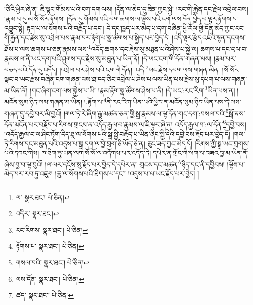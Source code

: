 །ཅིའི་ཕྱིར་ཞེ་ན། ཇི་ལྟར་གོམས་པའི་ངག་དག་ལས། །དོན་ལ་མེད་དུ་ཟིན་ཀྱང་སྐྱེ། །རང་གི་རྐྱེན་དང་རྗེས་འབྲེལ་བས། །རྣམ་པ་དུ་མ་སོ་སོར་རྟོགས། །དོན་དུ་གོམས་པའི་བག་ཆགས་ལ་ལྟོས་པའི་ངག་ལས་དོན་བྱེད་པ་ལྟར་རྟོགས་པ་འབྱུང་སྟེ། རྟག་པ་ལ་སོགས་པའི་བརྗོད་པ་དང་། དེ་དང་ཁྱད་པར་མེད་པ་དག་བཞིན་ཕྱི་རོལ་གྱི་དོན་མེད་ཀྱང་རང་གི་རྐྱེན་དང་རྗེས་སུ་འབྲེལ་པས་རྣམ་པར་རྟོག་པ་སྣ་ཚོགས་པ་སྐྱེད་པར་བྱེད་དོ། །འདི་ལྟར་རྩེད་འཇོའི་སྙན་དངགས་ཐོས་པ་ལས་ཆགས་པ་ཅན་རྣམས་ལས་\footnote{ལ་  སྣར་ཐང་།  པེ་ཅིན། }འདོད་ཆགས་དང་རྗེས་སུ་མཐུན་པའི་ཤེས་པ་སྐྱེ་ལ། ཆགས་པ་དང་བྲལ་བ་རྣམས་ལ་ནི་ཡང་དག་པའི་ཤུགས་དང་རྗེས་སུ་མཐུན་པ་ཡིན་ནོ། །དེ་ཡང་ངག་གི་དོན་གཞན་ལས། །རྣམ་པར་བཅད་པའི་དོན་དུ་འདོད། །འབྲེལ་པར་ཤེས་པའི་ངག་གི་དོན། །འདི་\footnote{འདིར་  སྣར་ཐང་། }ཡང་རྗེས་དཔག་ལས་གཞན་མིན། །སོ་སོར་སྣང་བ་ཡང་རྫས་བཞིན་ངག་གཞན་ལས་ཐ་དད་ཅིང་འབྲེལ་པ་ཤེས་པ་ལས་ཡིན་པས་རྗེས་སུ་དཔག་པ་ལས་གཞན་མ་ཡིན་ནོ། །གང་ཞིག་ངག་ལས་སྐྱེས་པ་ཡི། །རྣམ་རྟོག་སྣ་ཚོགས་ཤེས་པ་ནི། །དེ་ཡང་:རང་རིག་\footnote{རང་རིགས་  སྣར་ཐང་།  པེ་ཅིན། }ཡིན་པས་ན། །མངོན་སུམ་ཉིད་ལས་གཞན་མ་ཡིན། །:རྟོག་པ་\footnote{རྟོགས་པ་  སྣར་ཐང་།  པེ་ཅིན། }ནི་རང་རིག་ཡིན་པའི་ཕྱིར་ན་མངོན་སུམ་ཉིད་ཡིན་པས་དེ་ལས་གཞན་དུ་དབྱེ་བར་མི་བྱའོ། །གལ་ཏེ་རེ་ཞིག་རྒྱུ་མཚན་ཅན་གྱི་སྒྲ་རྣམས་ལ་ལྟ་དོན་གང་དག་:བསལ་བའི་\footnote{གསལ་བའི་  སྣར་ཐང་།  པེ་ཅིན། }སྒོ་ནས་དོན་མངོན་པར་བརྗོད་པ་རིགས་གྲངས་ན་འདོད་རྒྱལ་བ་རྣམས་ལ་ཇི་ལྟར་ཞེ་ན། འདོད་རྒྱལ་བ་:ལ་དོན་\footnote{ལས་དོན་  སྣར་ཐང་།  པེ་ཅིན། }དབྱེ་བས། །འདོད་རྒྱལ་བ་ལ་ཤིང་ཏོག་དིད་ཐཱ་ལ་སོགས་པའི་སྒྲ་སྤྱི་བརྗོད་པ་ཡིན་ཞིང་སྤྱི་དེའི་དབྱེ་བས་རྗོད་པར་བྱེད་དོ། །གལ་ཏེ་རིགས་དང་མཐུན་པའི་འདུས་པ་སྒྲ་དག་ལ་བྱེ་བྲག་ཅི་ཡོད་ཅེ་ན། ཅུང་ཟད་ཀྱང་མེད་དོ། །རིགས་ཀྱི་སྒྲ་ཡང་གྲགས་པའི་དབང་གིས། ཁ་ཅིག་ཏུ་ཡན་ལག་སོ་སོ་ལ་འདོགས་པར་འདོད་དེ། དཔེར་ན་གྲོང་གི་ཕག་པ་བཟའ་བྱ་མ་ཡིན་ནོ་ཞེས་བྱ་བ་ལྟ་བུའོ། །ལ་ལར་དངོས་སུ་རྗོད་པར་བྱེད་དེ་དཔེར་ན། གྲངས་དང་མཚན་\footnote{ཚད་  སྣར་ཐང་།  པེ་ཅིན། }ཉིད་དང་ནི་དབྱིབས། །ལྟོས་པ་མེད་པར་རབ་ཏུ་འཇུག །ཆུ་ལ་སོགས་པའི་ཐིགས་པ་དང་། །འདུས་པ་ལ་ཡང་རྗོད་པར་བྱེད། །

